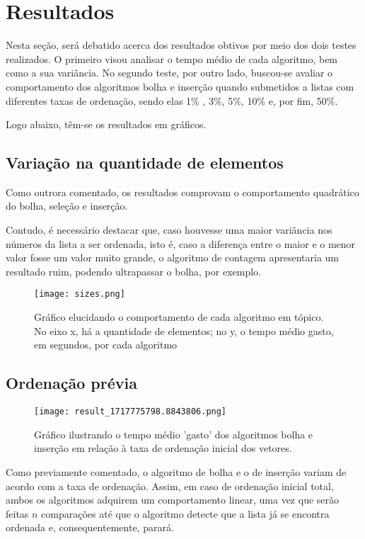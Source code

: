 \section{Resultados}
Nesta seção, será debatido acerca dos resultados obtivos por meio dos dois testes realizados. O primeiro visou analisar o tempo médio de cada algoritmo, bem como a sua variância. No segundo teste, por outro lado, buscou-se avaliar o comportamento dos algoritmos bolha e inserção quando submetidos a listas com diferentes taxas de ordenação, sendo elas 1\% , 3\%, 5\%, 10\% e, por fim, 50\%. 

Logo abaixo, têm-se os resultados em gráficos.

\subsection{Variação na quantidade de elementos}
Como outrora comentado, os resultados comprovam o comportamento quadrático do bolha, seleção e inserção. 

Contudo, é necessário destacar que, caso houvesse uma maior variância nos números da lista a ser ordenada, isto é, caso a diferença entre o maior e o menor valor fosse um valor muito grande, o algoritmo de contagem apresentaria um resultado ruim, podendo ultrapassar o bolha, por exemplo.
\begin{figure}[h]
    \texttt{[image: sizes.png]}
    \caption{Gráfico elucidando o comportamento de cada algoritmo em tópico. No eixo x, há a quantidade de elementos; no y, o tempo médio gasto, em segundos, por cada algoritmo}
    \end{figure}

    \subsection{Ordenação prévia}
    \begin{figure}[h]
        \texttt{[image: result\_1717775798.8843806.png]}
        \caption{Gráfico ilustrando o tempo médio 'gasto' dos algoritmos bolha e inserção em relação à taxa de ordenação inicial dos vetores.}
    \end{figure}

Como  previamente comentado, o algoritmo de bolha e o de inserção variam de acordo com a taxa de ordenação. Assim, em caso de ordenação inicial total, ambos os algoritmos adquirem um comportamento linear, uma vez que serão feitas $n$ comparações até que o algoritmo detecte que a lista já se encontra ordenada e, consequentemente, parará.
